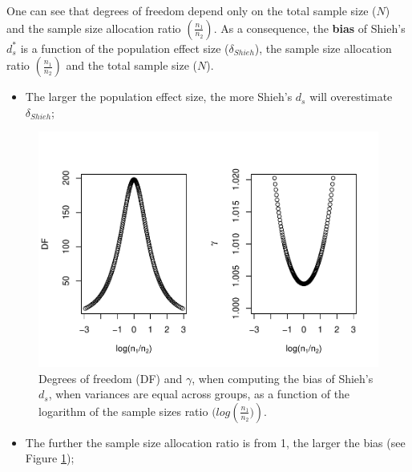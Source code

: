 \documentclass[
  english,
  man,mask]{apa6}
\providecommand{\tightlist}{%
  \setlength{\itemsep}{0pt}\setlength{\parskip}{0pt}}
\begin{document}
One can see that degrees of freedom depend only on the total sample size (\(N\)) and the sample size allocation ratio \(\left( \frac{n_1}{n_2}\right)\). As a consequence, the \textbf{bias} of Shieh's \(d^*_s\) is a function of the population effect size (\(\delta_{Shieh}\)), the sample size allocation ratio \(\left( \frac{n_1}{n_2}\right)\) and the total sample size (\(N\)).

\begin{itemize}
\tightlist
\item
  The larger the population effect size, the more Shieh's \(d_s\) will overestimate \(\delta_{Shieh}\);
\end{itemize}

\begin{figure}
\centering
\includegraphics{Theoretical-Bias-of-all-estimators-as-a-function-of-population-parameters_files/figure-latex/biasshiehhomNratio2-1.pdf}
\caption{\label{fig:biasshiehhomNratio2}Degrees of freedom (DF) and \(\gamma\), when computing the bias of Shieh's \(d_s\), when variances are equal across groups, as a function of the logarithm of the sample sizes ratio \((log \left(\frac{n_1}{n_2})\right)\).}
\end{figure}

\begin{itemize}
\tightlist
\item
  The further the sample size allocation ratio is from 1, the larger the bias (see Figure \ref{fig:biasshiehhomNratio2});
\end{itemize}
\end{document}
